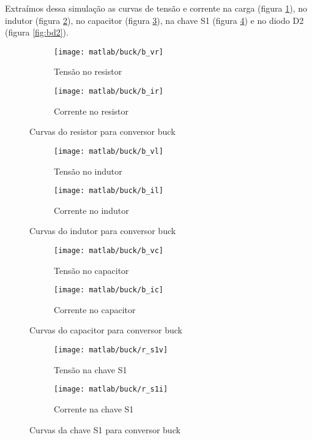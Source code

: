 \documentclass{article}
\begin{document}
Extraímos dessa simulação as curvas de tensão e corrente na carga (figura \ref{fig:br}), no indutor (figura \ref{fig:bl}), no capacitor (figura \ref{fig:bc}), na chave S1 (figura \ref{fig:bs1}) e no diodo D2 (figura \ref{fig:bd2}).
\begin{figure}[H]
	\centering
	\begin{subfigure}[b]{0.4\linewidth}
		\texttt{[image: matlab/buck/b\_vr]}
		\caption{Tensão no resistor}
	\end{subfigure}
	\begin{subfigure}[b]{0.4\linewidth}
		\centering
		\texttt{[image: matlab/buck/b\_ir]}
		\caption{Corrente no resistor}
	\end{subfigure}
	\caption{Curvas do resistor para conversor buck}
	\label{fig:br}
\end{figure}
\begin{figure}[H]
	\centering
	\begin{subfigure}[b]{0.4\linewidth}
		\texttt{[image: matlab/buck/b\_vl]}
		\caption{Tensão no indutor}
	\end{subfigure}
	\begin{subfigure}[b]{0.4\linewidth}
		\centering
		\texttt{[image: matlab/buck/b\_il]}
		\caption{Corrente no indutor}
	\end{subfigure}
	\caption{Curvas do indutor para conversor buck}
	\label{fig:bl}
\end{figure}
\begin{figure}[H]
	\centering
	\begin{subfigure}[b]{0.4\linewidth}
		\texttt{[image: matlab/buck/b\_vc]}
		\caption{Tensão no capacitor}
	\end{subfigure}
	\begin{subfigure}[b]{0.4\linewidth}
		\centering
		\texttt{[image: matlab/buck/b\_ic]}
		\caption{Corrente no capacitor}
	\end{subfigure}
	\caption{Curvas do capacitor para conversor buck}
	\label{fig:bc}
\end{figure}
\begin{figure}[H]
	\centering
	\begin{subfigure}[b]{0.4\linewidth}
		\texttt{[image: matlab/buck/r\_s1v]}
		\caption{Tensão na chave S1}
	\end{subfigure}
	\begin{subfigure}[b]{0.4\linewidth}
		\centering
		\texttt{[image: matlab/buck/r\_s1i]}
		\caption{Corrente na chave S1}
	\end{subfigure}
	\caption{Curvas da chave S1 para conversor buck}
	\label{fig:bs1}
\end{figure}
\end{document}
